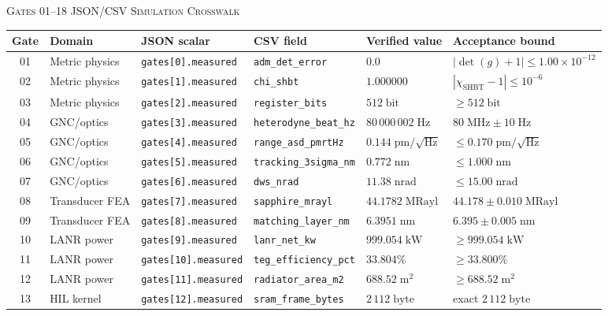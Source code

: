 \documentclass[10pt,twocolumn]{IEEEtran}
\begin{document}
\begin{table}[t]
\centering
\scriptsize
\textsc{Gates 01--18 JSON/CSV Simulation Crosswalk}\par\smallskip
\begin{tabular}{@{}cllllp{2.55cm}@{}}
\toprule
Gate & Domain & JSON scalar & CSV field & Verified value & Acceptance bound \\
\midrule
01 & Metric physics & \texttt{gates[0].measured} & \texttt{adm\_det\_error} & $0.0$ & $|\det(g)+1|\leq1.00\times10^{-12}$ \\
02 & Metric physics & \texttt{gates[1].measured} & \texttt{chi\_shbt} & $1.000000$ & $|\chi_{\mathrm{SHBT}}-1|\leq10^{-6}$ \\
03 & Metric physics & \texttt{gates[2].measured} & \texttt{register\_bits} & $512\;\mathrm{bit}$ & $\geq512\;\mathrm{bit}$ \\
04 & GNC/optics & \texttt{gates[3].measured} & \texttt{heterodyne\_beat\_hz} & $80\,000\,002\;\mathrm{Hz}$ & $80\;\mathrm{MHz}\pm10\;\mathrm{Hz}$ \\
05 & GNC/optics & \texttt{gates[4].measured} & \texttt{range\_asd\_pmrtHz} & $0.144\;\mathrm{pm}/\sqrt{\mathrm{Hz}}$ & $\leq0.170\;\mathrm{pm}/\sqrt{\mathrm{Hz}}$ \\
06 & GNC/optics & \texttt{gates[5].measured} & \texttt{tracking\_3sigma\_nm} & $0.772\;\mathrm{nm}$ & $\leq1.000\;\mathrm{nm}$ \\
07 & GNC/optics & \texttt{gates[6].measured} & \texttt{dws\_nrad} & $11.38\;\mathrm{nrad}$ & $\leq15.00\;\mathrm{nrad}$ \\
08 & Transducer FEA & \texttt{gates[7].measured} & \texttt{sapphire\_mrayl} & $44.1782\;\mathrm{MRayl}$ & $44.178\pm0.010\;\mathrm{MRayl}$ \\
09 & Transducer FEA & \texttt{gates[8].measured} & \texttt{matching\_layer\_nm} & $6.3951\;\mathrm{nm}$ & $6.395\pm0.005\;\mathrm{nm}$ \\
10 & LANR power & \texttt{gates[9].measured} & \texttt{lanr\_net\_kw} & $999.054\;\mathrm{kW}$ & $\geq999.054\;\mathrm{kW}$ \\
11 & LANR power & \texttt{gates[10].measured} & \texttt{teg\_efficiency\_pct} & $33.804\%$ & $\geq33.800\%$ \\
12 & LANR power & \texttt{gates[11].measured} & \texttt{radiator\_area\_m2} & $688.52\;\mathrm{m^2}$ & $\geq688.52\;\mathrm{m^2}$ \\
13 & HIL kernel & \texttt{gates[12].measured} & \texttt{sram\_frame\_bytes} & $2\,112\;\mathrm{byte}$ & exact $2\,112\;\mathrm{byte}$ \\

\end{tabular}
\end{table}
\end{document}
